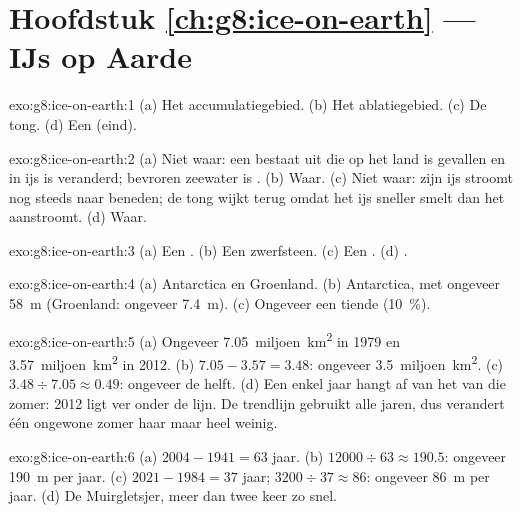 \section*{Hoofdstuk \ref{ch:g8:ice-on-earth} --- IJs op Aarde}

\begin{solution}{exo:g8:ice-on-earth:1}
(a) Het accumulatiegebied. (b) Het ablatiegebied. (c) De tong. (d) Een
(eind).
\end{solution}

\begin{solution}{exo:g8:ice-on-earth:2}
(a) Niet waar: een  bestaat uit  die op het land is gevallen
en in ijs is veranderd; bevroren zeewater is . (b) Waar. (c) Niet
waar: zijn ijs stroomt nog steeds naar beneden; de tong wijkt terug omdat
het ijs sneller smelt dan het aanstroomt. (d) Waar.
\end{solution}

\begin{solution}{exo:g8:ice-on-earth:3}
(a) Een . (b) Een zwerfsteen. (c) Een . (d) .
\end{solution}

\begin{solution}{exo:g8:ice-on-earth:4}
(a) Antarctica en Groenland. (b) Antarctica, met ongeveer \qty{58}{m}
(Groenland: ongeveer \qty{7.4}{m}). (c) Ongeveer een tiende (10~\%).
\end{solution}

\begin{solution}{exo:g8:ice-on-earth:5}
(a) Ongeveer \num{7.05}~miljoen~\unit{km^2} in 1979 en \num{3.57}~miljoen~\unit{km^2}
in 2012. (b) $7.05 - 3.57 = 3.48$: ongeveer \num{3.5}~miljoen~\unit{km^2}.
(c) $3.48 \div 7.05 \approx 0.49$: ongeveer de helft. (d) Een enkel jaar
hangt af van het  van die zomer: 2012 ligt ver onder de lijn. De
trendlijn gebruikt alle jaren, dus verandert één ongewone zomer haar maar
heel weinig.
\end{solution}

\begin{solution}{exo:g8:ice-on-earth:6}
(a) $2004 - 1941 = 63$ jaar. (b) $12000 \div 63 \approx 190.5$: ongeveer
\qty{190}{m} per jaar. (c) $2021 - 1984 = 37$ jaar; $3200 \div 37 \approx
86$: ongeveer \qty{86}{m} per jaar. (d) De Muirgletsjer, meer dan twee
keer zo snel.
\end{solution}

